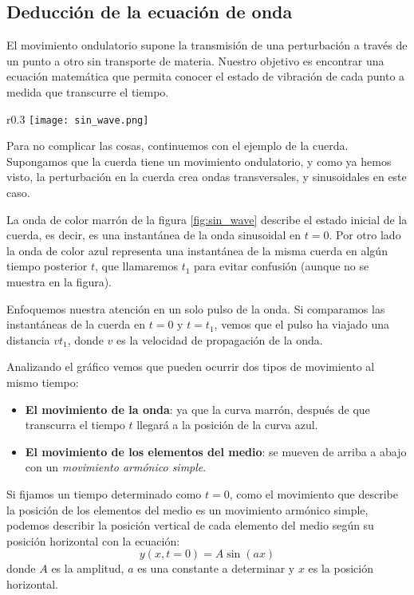 \subsection{Deducción de la ecuación de onda}

El movimiento ondulatorio supone la transmisión de una perturbación a través de un punto a otro sin transporte de materia. Nuestro objetivo es encontrar una ecuación matemática que permita conocer el estado de vibración de cada punto a medida que transcurre el tiempo.

\begin{wrapfigure}{r}{0.3\textwidth}
  \centering
  \texttt{[image: sin\_wave.png]}
  \caption{Onda sinusoidal que viaja hacia la derecha con una rapidez \(v\).}
  \label{fig:sin_wave}
\end{wrapfigure}
Para no complicar las cosas, continuemos con el ejemplo de la cuerda. Supongamos que la cuerda tiene un movimiento ondulatorio, y como ya hemos visto, la perturbación en la cuerda crea ondas transversales, y sinusoidales en este caso. 

La onda de color marrón de la figura \ref{fig:sin_wave} describe el estado inicial de la cuerda, es decir, es una instantánea de la onda sinusoidal en \(t=0\). Por otro lado la onda de color azul representa una instantánea de la misma cuerda en algún tiempo posterior \(t\), que llamaremos \(t_1\) para evitar confusión (aunque no se muestra en la figura).

Enfoquemos nuestra atención en un solo pulso de la onda. Si comparamos las instantáneas de la cuerda en \(t=0\) y \(t=t_1\), vemos que el pulso ha viajado una distancia \(v t_1\), donde \(v\) es la velocidad de propagación de la onda. 

Analizando el gráfico vemos que pueden ocurrir dos tipos de movimiento al mismo tiempo:
\begin{itemize}
  \item \textbf{El movimiento de la onda}: ya que la curva marrón, después de que transcurra el tiempo \(t\) llegará a la posición de la curva azul.
  \item \textbf{El movimiento de los elementos del medio}: se mueven de arriba a abajo con un \textit{movimiento armónico simple}. 
\end{itemize}

Si fijamos un tiempo determinado como \(t=0\), como el movimiento que describe la posición de los elementos del medio es un movimiento armónico simple, podemos describir la posición vertical de cada elemento del medio según su posición horizontal con la ecuación:
\begin{equation}
  y(x, t=0) = A \sin(ax)
  \label{eq:sin_wave}
\end{equation}
donde \(A\) es la amplitud, \(a\) es una constante a determinar y \(x\) es la posición horizontal. 

